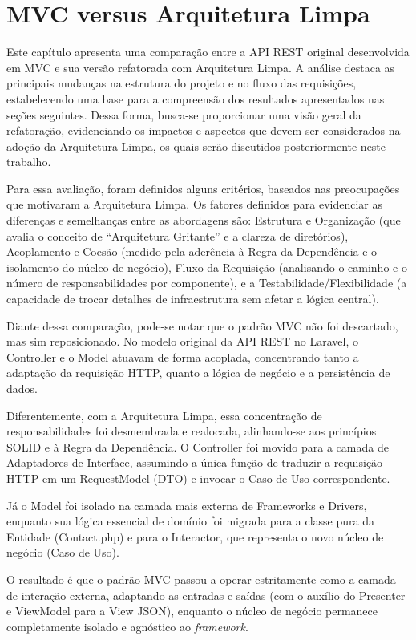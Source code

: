 \chapter{MVC versus Arquitetura Limpa}
\thispagestyle{headings}

    \par Este capítulo apresenta uma comparação entre a API REST original desenvolvida em MVC e sua versão refatorada com Arquitetura Limpa. A análise destaca as principais mudanças na estrutura do projeto e no fluxo das requisições, estabelecendo uma base para a compreensão dos resultados apresentados nas seções seguintes. Dessa forma, busca-se proporcionar uma visão geral da refatoração, evidenciando os impactos e aspectos que devem ser considerados na adoção da Arquitetura Limpa, os quais serão discutidos posteriormente neste trabalho.

    \par Para essa avaliação, foram definidos alguns critérios, baseados nas preocupações que motivaram a Arquitetura Limpa. Os fatores definidos para evidenciar as diferenças e semelhanças entre as abordagens são: Estrutura e Organização (que avalia o conceito de ``Arquitetura Gritante'' e a clareza de diretórios), Acoplamento e Coesão (medido pela aderência à Regra da Dependência e o isolamento do núcleo de negócio), Fluxo da Requisição (analisando o caminho e o número de responsabilidades por componente), e a Testabilidade/Flexibilidade (a capacidade de trocar detalhes de infraestrutura sem afetar a lógica central).
    
    

    

    \par Diante dessa comparação, pode-se notar que o padrão MVC não foi descartado, mas sim reposicionado. No modelo original da API REST no Laravel, o Controller e o Model atuavam de forma acoplada, concentrando tanto a adaptação da requisição HTTP, quanto a lógica de negócio e a persistência de dados.

    \par Diferentemente, com a Arquitetura Limpa, essa concentração de responsabilidades foi desmembrada e realocada, alinhando-se aos princípios SOLID e à Regra da Dependência. O Controller foi movido para a camada de Adaptadores de Interface, assumindo a única função de traduzir a requisição HTTP em um RequestModel (DTO) e invocar o Caso de Uso correspondente.

    \par Já o Model foi isolado na camada mais externa de Frameworks e Drivers, enquanto sua lógica essencial de domínio foi migrada para a classe pura da Entidade (Contact.php) e para o Interactor, que representa o novo núcleo de negócio (Caso de Uso).

    \par O resultado é que o padrão MVC passou a operar estritamente como a camada de interação externa, adaptando as entradas e saídas (com o auxílio do Presenter e ViewModel para a View JSON), enquanto o núcleo de negócio permanece completamente isolado e agnóstico ao \textit{framework}.